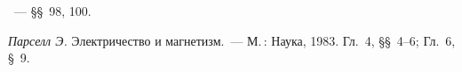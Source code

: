 \begin{lab:literature}

\item \SivuhinIII~--- \S\S~98, 100.

\item \emph{Парселл Э.} Электричество и магнетизм.~--- М.\,: Наука, 1983. Гл.~4,
\S\S~4--6; Гл.~6, \S~9.

\end{lab:literature}
